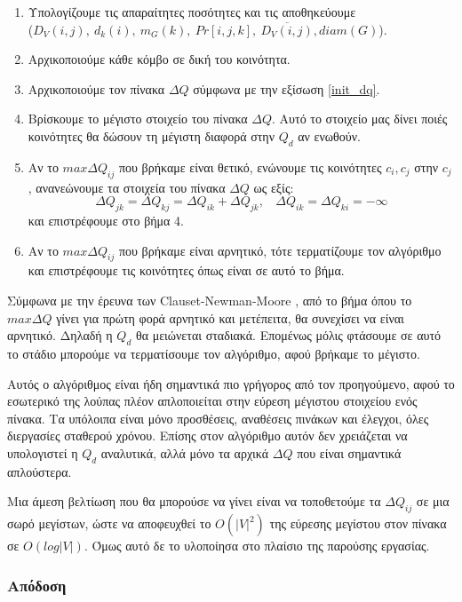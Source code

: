 \documentclass[10pt, letterpaper]{article}
\newcommand{\en}{\selectlanguage{english}}
\newcommand{\gr}{\selectlanguage{greek}}
\begin{document}
\begin{enumerate}
  \item Υπολογίζουμε τις απαραίτητες ποσότητες και τις αποθηκεύουμε \\ ($D_V(i,j), \ d_k(i), \ m_G(k), \ Pr[i,j,k],  \ \overline{D_V(i,j)},diam(G)$). 
  \item Αρχικοποιούμε κάθε κόμβο σε δική του κοινότητα.
  \item Αρχικοποιούμε τον πίνακα $\Delta Q$ σύμφωνα με την εξίσωση \ref{init_dq}. 
  \item Βρίσκουμε το μέγιστο στοιχείο του πίνακα $\Delta Q$. Αυτό το στοιχείο μας 
  δίνει ποιές κοινότητες θα δώσουν τη μέγιστη διαφορά στην $Q_d$ αν ενωθούν.
  \item Αν το $max \Delta Q_{ij}$ που βρήκαμε είναι θετικό, ενώνουμε τις κοινότητες 
  $c_i, c_j$ στην $c_j$, ανανεώνουμε τα στοιχεία του πίνακα $\Delta Q$ ως εξίς:
  \[ \Delta Q_{jk} = \Delta Q_{kj} = \Delta Q_{ik} + \Delta Q_{jk}, \ \ \ \ \Delta Q_{ik} = \Delta Q_{ki} = -\infty \]
  και επιστρέφουμε στο βήμα 4. 
  \item Αν το $max \Delta Q_{ij}$ που βρήκαμε είναι αρνητικό, τότε τερματίζουμε τον αλγόριθμο
  και επιστρέφουμε τις κοινότητες όπως είναι σε αυτό το βήμα. 
\end{enumerate}





Σύμφωνα με την έρευνα των \en Clauset-Newman-Moore \gr \cite{Clauset:fastgreedy},
από το βήμα όπου το $max \Delta Q$ γίνει για πρώτη φορά αρνητικό και μετέπειτα, θα 
συνεχίσει να είναι αρνητικό. Δηλαδή η $Q_d$ θα μειώνεται σταδιακά. Επομένως μόλις φτάσουμε 
σε αυτό το στάδιο μπορούμε να τερματίσουμε τον αλγόριθμο, αφού βρήκαμε το μέγιστο. 

Αυτός ο αλγόριθμος είναι ήδη σημαντικά πιο γρήγορος από τον προηγούμενο, αφού το εσωτερικό 
της λούπας πλέον απλοποιείται στην εύρεση μέγιστου στοιχείου ενός πίνακα. Τα υπόλοιπα είναι 
μόνο προσθέσεις, αναθέσεις πινάκων και έλεγχοι, όλες διεργασίες 
σταθερού χρόνου. Επίσης στον αλγόριθμο αυτόν δεν χρειάζεται να υπολογιστεί η $Q_d$ 
αναλυτικά, αλλά μόνο τα αρχικά $\Delta Q$ που είναι σημαντικά απλούστερα.

Μια άμεση βελτίωση που θα μπορούσε να γίνει \cite{Clauset:fastgreedy} είναι να τοποθετούμε 
τα $\Delta Q_{ij}$ σε μια σωρό μεγίστων, ώστε να αποφευχθεί το $O(|V|^2)$ της εύρεσης 
μεγίστου στον πίνακα σε $O(log|V|)$. Όμως αυτό δε το υλοποίησα στο πλαίσιο της παρούσης 
εργασίας.

\subsubsection{Απόδοση}
\end{document}
